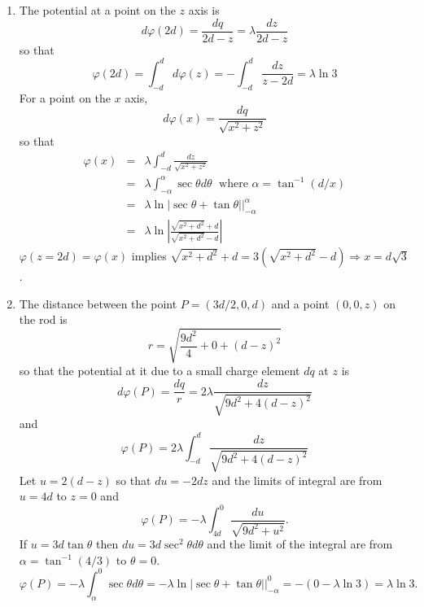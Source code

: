 \documentclass{article}
\begin{document}
\begin{enumerate}
\item The potential at a point on the $z$ axis is
\[
d\varphi(2d) = \frac{dq}{2d - z} = \lambda\frac{dz}{2d - z}
\]
so that
\begin{equation}\label{e22}
\varphi(2d) = \int_{-d}^d d\varphi(z) = -\int_{-d}^d\frac{dz}{z - 2d} = \lambda\ln 3
\end{equation}
For a point on the $x$ axis,
\[
d\varphi(x) = \frac{dq}{\sqrt{x^2 + z^2}}
\]
so that
\begin{eqnarray}
\varphi(x) &=& \lambda\int_{-d}^d\frac{dz}{\sqrt{x^2 + z^2}} \nonumber \\
 &=& \lambda\int_{-\alpha}^\alpha \sec\theta d\theta\;\text{ where }\alpha = \tan^{-1}(d/x) \nonumber \\
 &=& \lambda\ln|\sec\theta + \tan\theta|\Big|_{-\alpha}^\alpha \nonumber \\
 &=& \lambda\ln\left|\frac{\sqrt{x^2 + d^2} + d}{\sqrt{x^2 + d^2} - d}\right| \label{e23}
\end{eqnarray}
$\varphi(z = 2d) = \varphi(x)$ implies $\sqrt{x^2 + d^2} + d = 3(\sqrt{x^2 + d^2} - d)
\Rightarrow x = d\sqrt{3}$.

\item The distance between the point $P = (3d/2, 0, d)$ and a point $(0, 0, z)$ on
the rod is
\begin{equation}\label{e24}
r = \sqrt{\frac{9d^2}{4} + 0 + (d - z)^2}
\end{equation}
so that the potential at it due to a small charge element $dq$ at $z$ is
\[
d\varphi(P) = \frac{dq}{r} = 2\lambda\frac{dz}{\sqrt{9d^2 + 4(d - z)^2}}
\]
and 
\[
\varphi(P) = 2\lambda\int_{-d}^d\frac{dz}{\sqrt{9d^2 + 4(d - z)^2}}
\]
Let $u = 2(d - z)$ so that $du = -2dz$ and the limits of integral are from $u=4d$
to $z = 0$ and
\[
\varphi(P) = -\lambda\int_{4d}^0\frac{du}{\sqrt{9d^2 + u^2}}.
\]
If $u = 3d\tan\theta$ then $du = 3d\sec^2\theta d\theta$ and the limit of the 
integral are from $\alpha = \tan^{-1}(4/3)$ to $\theta = 0$.
\[
\varphi(P) = -\lambda\int_{\alpha}^0\sec\theta d\theta = 
-\lambda\ln|\sec\theta + \tan\theta|\Big|_{-\alpha}^0 =
-(0 - \lambda\ln 3) = \lambda\ln 3.
\]


\end{enumerate}
\end{document}
